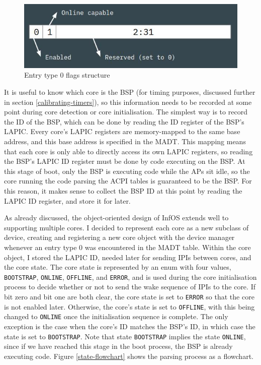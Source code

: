 \documentclass[bsc,frontabs,singlespacing,parskip,deptreport]{infthesis}
\begin{document}
\begin{figure}[h]
    \centering
    \includegraphics[scale=0.6]{figures/entry0flags.jpg}
    \caption{Entry type 0 flags structure}
    \label{entry0flags}
\end{figure}

It is useful to know which core is the BSP (for timing purposes, discussed further in section \ref{calibrating-timers}), so this information needs to be recorded at some point during core detection or core initialisation. The simplest way is to record the ID of the BSP, which can be done by reading the ID register of the BSP's LAPIC. Every core's LAPIC registers are memory-mapped to the same base address, and this base address is specified in the MADT. This mapping means that each core is only able to directly access its own LAPIC registers, so reading the BSP's LAPIC ID register must be done by code executing on the BSP. At this stage of boot, only the BSP is executing code while the APs sit idle, so the core running the code parsing the ACPI tables is guaranteed to be the BSP. For this reason, it makes sense to collect the BSP ID at this point by reading the LAPIC ID register, and store it for later.

As already discussed, the object-oriented design of InfOS extends well to supporting multiple cores. I decided to represent each core as a new subclass of device, creating and registering a new core object with the device manager whenever an entry type 0 was encountered in the MADT table. Within the core object, I stored the LAPIC ID, needed later for sending IPIs between cores, and the core state. The core state is represented by an enum with four values, \verb|BOOTSTRAP|, \verb|ONLINE|, \verb|OFFLINE|, and \verb|ERROR|, and is used during the core initialisation process to decide whether or not to send the wake sequence of IPIs to the core. If bit zero and bit one are both clear, the core state is set to \verb|ERROR| so that the core is not enabled later. Otherwise, the core's state is set to \verb|OFFLINE|, with this being changed to \verb|ONLINE| once the initialisation sequence is complete. The only exception is the case when the core's ID matches the BSP's ID, in which case the state is set to \verb|BOOTSTRAP|. Note that state \verb|BOOTSTRAP| implies the state \verb|ONLINE|, since if we have reached this stage in the boot process, the BSP is already executing code. Figure \ref{state-flowchart} shows the parsing process as a flowchart.
\end{document}
